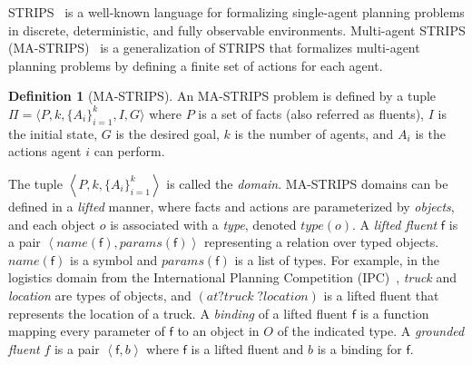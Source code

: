 \documentclass[letterpaper]{article} %
\theoremstyle{definition}
\newtheorem{definition}{Definition}
\theoremstyle{remark}
\newcommand{\tuple}[1]{\ensuremath{\left \langle #1 \right \rangle }}
\newcommand{\params}{\textit{params}}
\newcommand{\name}{\textit{name}}
\newcommand{\type}{\textit{type}}
\newcommand{\liftf}{\mathsf{f}}
\begin{document}
STRIPS~ is a well-known language for formalizing single-agent planning problems in discrete, deterministic, and fully observable environments. 
Multi-agent STRIPS (MA-STRIPS)~\cite{brafman2008one} is a generalization of STRIPS that formalizes multi-agent planning problems by defining a finite set of actions for each agent. %
\begin{definition}[MA-STRIPS]
An MA-STRIPS problem is defined by a tuple $\Pi=\langle P, k, \{A_i\}_{i=1}^k, I, G \rangle$ where $P$ is a set of facts (also referred as fluents), $I$ is the initial state, $G$ is the desired goal, $k$ is the number of agents, and $A_i$ is the actions agent $i$ can perform. 
\label{def:ma-strips}
\end{definition} 
The tuple $\tuple{P,k,\{A_i\}_{i=1}^k}$ is called the \emph{domain}.  
MA-STRIPS domains can be defined in a \emph{lifted} manner, where facts and actions are parameterized by \emph{objects}, and each object $o$ is associated with a \emph{type}, denoted $\type(o)$. 
A \emph{lifted fluent} $\liftf$ is a pair $\tuple{\name(
\liftf), \params(\liftf)}$ representing a relation over typed objects. $\name(\liftf)$ is a symbol and $\params(\liftf)$ is a list of types. 
For example, in the logistics domain from the International Planning Competition (IPC)~\cite{ipc}, \emph{truck} and \emph{location} are types of objects, and $(at ?truck\; ?location)$ is a lifted fluent that represents the location of a truck. %
A \emph{binding} of a lifted fluent $\liftf$ is a function %
mapping every parameter of $\liftf$ to an object in $O$ of the indicated type. 
A \emph{grounded fluent} $f$ is a pair $\tuple{\liftf, b}$ where $\liftf$ is a lifted fluent 
and $b$ is a binding for $\liftf$. 
\end{document}
